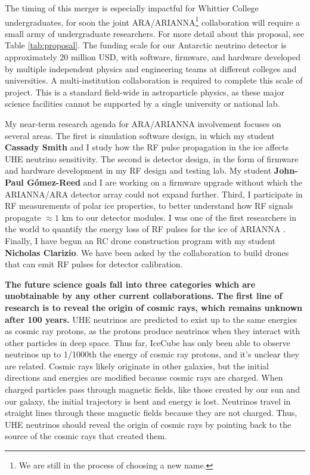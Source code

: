 \documentclass[../../main.tex]{subfiles}
\begin{document}
The timing of this merger is especially impactful for Whittier College undergraduates, for soon the joint ARA/ARIANNA\footnote{We are still in the process of choosing a new name.} collaboration will require a small army of undergraduate researchers.  For more detail about this proposal, see Table \ref{tab:proposal}.  The funding scale for our Antarctic neutrino detector is approximately 20 million USD, with software, firmware, and hardware developed by multiple independent physics and engineering teams at different colleges and universities.  A multi-institution collaboration is required to complete this scale of project.  This is a standard field-wide in astroparticle physics, as these major science facilities cannot be supported by a single university or national lab.\\ \hspace{0.1cm}

My near-term research agenda for ARA/ARIANNA involvement focuses on several areas.  The first is simulation software design, in which my student \textbf{Cassady Smith} and I study how the RF pulse propagation in the ice affects UHE neutrino sensitivity.  The second is detector design, in the form of firmware and hardware development in my RF design and testing lab.  My student \textbf{John-Paul G\'{o}mez-Reed} and I are working on a firmware upgrade without which the ARIANNA/ARA detector array could not expand further.  Third, I participate in RF measurements of polar ice properties, to better understand how RF signals propagate $\approx 1$ km to our detector modules.  I was one of the first researchers in the world to quantify the energy loss of RF pulses for the ice of ARIANNA \cite{hanson2015}. Finally, I have begun an RC drone construction program with my student \textbf{Nicholas Clarizio}.  We have been asked by the collaboration to build drones that can emit RF pulses for detector calibration.  \\ \hspace{0.1cm}

\textbf{The future science goals fall into three categories which are unobtainable by any other current collaborations.}  \textbf{The first line of research is to reveal the origin of cosmic rays, which remains unknown after 100 years.}  UHE neutrinos are predicted to exist up to the same energies as cosmic ray protons, as the protons produce neutrinos when they interact with other particles in deep space.  Thus far, IceCube has only been able to observe neutrinos up to 1/1000th the energy of cosmic ray protons, and it's unclear they are related.  Cosmic rays likely originate in other galaxies, but the initial directions and energies are modified because cosmic rays are charged.  When charged particles pass through magnetic fields, like those created by our sun and our galaxy, the initial trajectory is bent and energy is lost.  Neutrinos travel in straight lines through these magnetic fields because they are not charged.  Thus, UHE neutrinos should reveal the origin of cosmic rays by pointing back to the source of the cosmic rays that created them. \\ \hspace{0.1cm}
\end{document}
